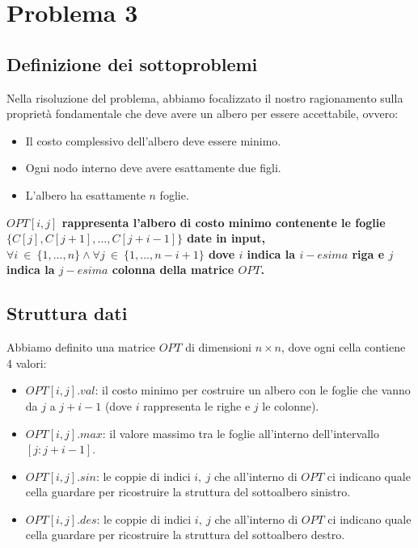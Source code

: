 \section{Problema 3}

\subsection{Definizione dei sottoproblemi}

Nella risoluzione del problema, abbiamo focalizzato il nostro ragionamento sulla proprietà fondamentale che deve avere un albero per
essere accettabile, ovvero:
\begin{itemize}
    \item Il costo complessivo dell'albero deve essere minimo.
    \item Ogni nodo interno deve avere esattamente due figli.
    \item L'albero ha  esattamente $n$ foglie.
\end{itemize}

\begin{center}
    \textbf{$OPT[i, j]$ rappresenta l'albero di costo minimo contenente le foglie $\{C[j], C[j + 1], ..., C[j + i - 1]\}$ date in input, 
    $\forall i\ \in\ \{1, ..., n\} \land \forall j\ \in\ \{1, ..., n - i + 1\}$ dove $i$ indica la $i-esima$ riga e $j$ indica la $j-esima$ colonna della matrice $OPT$.}
\end{center}

\subsection{Struttura dati}

Abbiamo definito una matrice $OPT$ di dimensioni $n \times n$, dove ogni cella contiene 4 valori:

\begin{itemize}
  \item $OPT[i, j].val$: il costo minimo per costruire un albero con le foglie che vanno da $j$ a $j + i - 1$ (dove $i$ rappresenta le righe e $j$ le colonne).
  \item $OPT[i, j].max$: il valore massimo tra le foglie all'interno dell'intervallo $[j: j + i - 1]$.
  \item $OPT[i, j].sin$: le coppie di indici $i,\ j$ che all'interno di $OPT$ ci indicano quale cella guardare per ricostruire la struttura del sottoalbero sinistro.
  \item $OPT[i, j].des$: le coppie di indici $i,\ j$ che all'interno di $OPT$ ci indicano quale cella guardare per ricostruire la struttura del sottoalbero destro.
\end{itemize}

